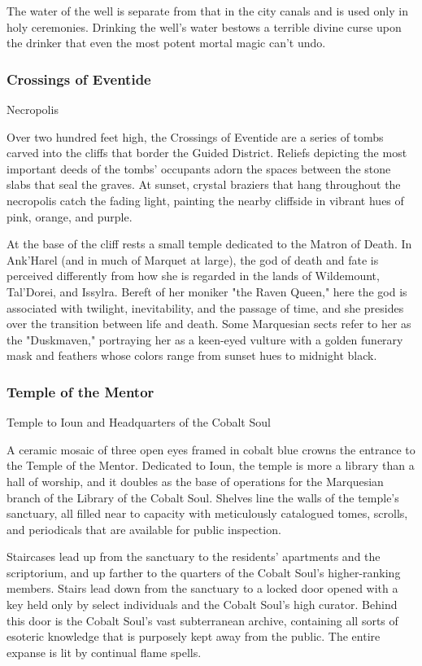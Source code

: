 \documentclass[10pt,a4paper,twoside,twocolumn,openany,nodeprecatedcode]{dndbook}
\begin{document}
The water of the well is separate from that in the city canals and is used only in holy ceremonies. Drinking the well's water bestows a terrible divine curse upon the drinker that even the most potent mortal magic can't undo.

\subsubsection{Crossings of Eventide}
Necropolis

Over two hundred feet high, the Crossings of Eventide are a series of tombs carved into the cliffs that border the Guided District. Reliefs depicting the most important deeds of the tombs' occupants adorn the spaces between the stone slabs that seal the graves. At sunset, crystal braziers that hang throughout the necropolis catch the fading light, painting the nearby cliffside in vibrant hues of pink, orange, and purple.

At the base of the cliff rests a small temple dedicated to the Matron of Death. In Ank'Harel (and in much of Marquet at large), the god of death and fate is perceived differently from how she is regarded in the lands of Wildemount, Tal'Dorei, and Issylra. Bereft of her moniker "the Raven Queen," here the god is associated with twilight, inevitability, and the passage of time, and she presides over the transition between life and death. Some Marquesian sects refer to her as the "Duskmaven," portraying her as a keen-eyed vulture with a golden funerary mask and feathers whose colors range from sunset hues to midnight black.

\subsubsection{Temple of the Mentor}
Temple to Ioun and Headquarters of the Cobalt Soul

A ceramic mosaic of three open eyes framed in cobalt blue crowns the entrance to the Temple of the Mentor. Dedicated to Ioun, the temple is more a library than a hall of worship, and it doubles as the base of operations for the Marquesian branch of the Library of the Cobalt Soul. Shelves line the walls of the temple's sanctuary, all filled near to capacity with meticulously catalogued tomes, scrolls, and periodicals that are available for public inspection.

Staircases lead up from the sanctuary to the residents' apartments and the scriptorium, and up farther to the quarters of the Cobalt Soul's higher-ranking members. Stairs lead down from the sanctuary to a locked door opened with a key held only by select individuals and the Cobalt Soul's high curator. Behind this door is the Cobalt Soul's vast subterranean archive, containing all sorts of esoteric knowledge that is purposely kept away from the public. The entire expanse is lit by continual flame spells.
\end{document}
